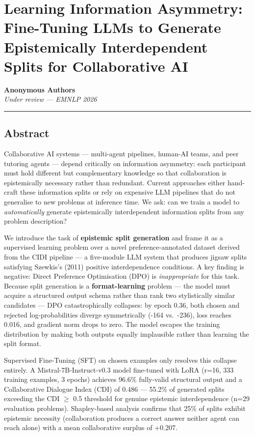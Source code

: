 \documentclass[
  11pt,
]{article}
\author{}
\date{}
\begin{document}
\section{Learning Information Asymmetry: Fine-Tuning LLMs to Generate
Epistemically Interdependent Splits for Collaborative
AI}\label{learning-information-asymmetry-fine-tuning-llms-to-generate-epistemically-interdependent-splits-for-collaborative-ai}

\textbf{Anonymous Authors}\\
\emph{Under review --- EMNLP 2026}

\begin{center}\rule{0.5\linewidth}{0.5pt}\end{center}

\subsection{Abstract}\label{abstract}

Collaborative AI systems --- multi-agent pipelines, human-AI teams, and
peer tutoring agents --- depend critically on information asymmetry:
each participant must hold different but complementary knowledge so that
collaboration is epistemically necessary rather than redundant. Current
approaches either hand-craft these information splits or rely on
expensive LLM pipelines that do not generalise to new problems at
inference time. We ask: can we train a model to \emph{automatically}
generate epistemically interdependent information splits from any
problem description?

We introduce the task of \textbf{epistemic split generation} and frame
it as a supervised learning problem over a novel preference-annotated
dataset derived from the CIDI pipeline --- a five-module LLM system that
produces jigsaw splits satisfying Szewkis's (2011) positive
interdependence conditions. A key finding is negative: Direct Preference
Optimisation (DPO) is \emph{inappropriate} for this task. Because split
generation is a \textbf{format-learning} problem --- the model must
acquire a structured output schema rather than rank two stylistically
similar candidates --- DPO catastrophically collapses: by epoch 0.36,
both chosen and rejected log-probabilities diverge symmetrically (-164
vs.~-236), loss reaches 0.016, and gradient norm drops to zero. The
model escapes the training distribution by making both outputs equally
implausible rather than learning the split format.

Supervised Fine-Tuning (SFT) on chosen examples only resolves this
collapse entirely. A Mistral-7B-Instruct-v0.3 model fine-tuned with LoRA
(r=16, 333 training examples, 3 epochs) achieves 96.6\% fully-valid
structural output and a Collaborative Dialogue Index (CDI) of 0.486 ---
55.2\% of generated splits exceeding the CDI $\geq$ 0.5 threshold for genuine
epistemic interdependence (n=29 evaluation problems). Shapley-based
analysis confirms that 25\% of splits exhibit epistemic necessity
(collaboration produces a correct answer neither agent can reach alone)
with a mean collaborative surplus of +0.207.
\end{document}

